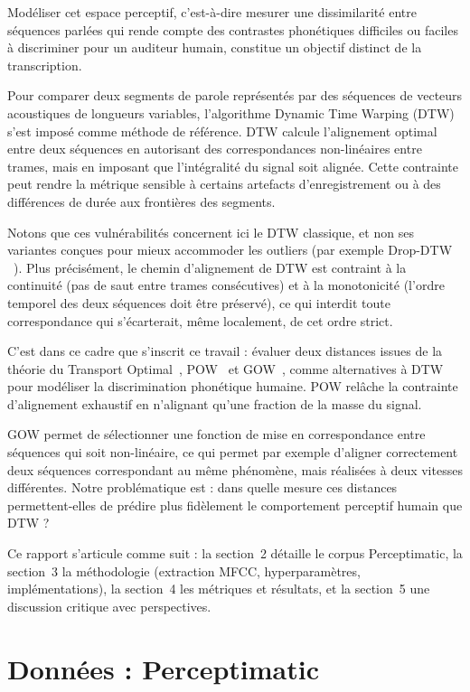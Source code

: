 \documentclass{article}
\begin{document}
Modéliser cet espace perceptif, c'est-à-dire mesurer une
dissimilarité entre séquences parlées qui rende compte des contrastes
phonétiques difficiles ou faciles à discriminer pour un auditeur humain,
constitue un objectif distinct de la transcription.

Pour comparer deux segments de parole représentés par des séquences de
vecteurs acoustiques de longueurs variables, l'algorithme Dynamic Time
Warping (DTW)~\cite{dtw} s'est imposé comme méthode de référence. DTW
calcule l'alignement optimal entre deux séquences en autorisant des
correspondances non-linéaires entre trames, mais en imposant que l'intégralité
du signal soit alignée. Cette contrainte peut rendre la
métrique sensible à certains artefacts d'enregistrement ou à des différences
de durée aux frontières des segments.

Notons que ces vulnérabilités concernent ici le DTW classique, et non ses
variantes conçues pour mieux accommoder les outliers (par exemple Drop-DTW ~\cite{Drop-DTW}).
Plus précisément, le chemin d'alignement de DTW est contraint à la
continuité (pas de saut entre trames consécutives) et à la monotonicité
(l'ordre temporel des deux séquences doit être préservé), ce qui interdit
toute correspondance qui s'écarterait, même localement, de cet ordre strict.

C'est dans ce cadre que s'inscrit ce travail : évaluer deux distances issues
de la théorie du Transport Optimal~\cite{optimal_transport}, POW~\cite{pow2024}
et GOW~\cite{gow2025}, comme alternatives à DTW pour modéliser la discrimination
phonétique humaine. POW relâche la contrainte d'alignement exhaustif en
n'alignant qu'une fraction de la masse du signal.

GOW permet de sélectionner une fonction de mise en correspondance entre
séquences qui soit non-linéaire, ce qui permet par exemple d'aligner
correctement deux séquences correspondant au même phénomène, mais réalisées
à deux vitesses différentes. Notre problématique est : dans quelle mesure
ces distances permettent-elles de prédire plus fidèlement le comportement
perceptif humain que DTW ?

Ce rapport s'articule comme suit : la section~2 détaille le corpus
Perceptimatic, la section~3 la méthodologie (extraction MFCC,
hyperparamètres, implémentations), la section~4 les métriques et résultats,
et la section~5 une discussion critique avec perspectives.

\section{Données : Perceptimatic}
\label{sec:donnees}
\end{document}
